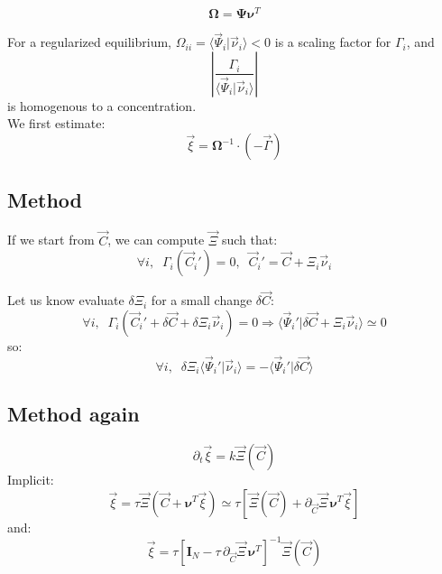 \documentclass[aps,12pt]{revtex4}
\begin{document}
\begin{equation}
	\bm{\Omega} = \bm{\Psi} \bm{\nu}^T
\end{equation}	

For a regularized equilibrium, $\Omega_{ii}=\langle \vec{\Psi}_i \vert \vec{\nu}_i \rangle < 0$ is
a scaling factor for $\Gamma_i$, and
\begin{equation}
	\left\vert \dfrac{\Gamma_i}{\langle \vec{\Psi}_i \vert \vec{\nu}_i \rangle} \right\vert
\end{equation}
is homogenous to a concentration.\\
We first estimate:
\begin{equation}
	\vec{\xi} =  {\bm{\Omega}}^{-1} \cdot (-\vec{\Gamma} )
\end{equation}

\subsection{Method}

If we start from $\vec{C}$, we can compute $\vec{\Xi}$ such that:
\begin{equation}
	\forall i, \;\; \Gamma_i(\vec{C}_i') = 0, \;\; \vec{C}_i' = \vec{C} + \Xi_i \vec{\nu}_i
\end{equation}

Let us know evaluate $\delta\Xi_i$ for a small change $\delta\vec{C}$:
\begin{equation}
	\forall i, \;\;  \Gamma_i(\vec{C}_i' + \delta\vec{C} + \delta\Xi_i \vec{\nu}_i) = 0 \Rightarrow 
	\langle \vec{\Psi}_i' \vert \delta\vec{C} +   \Xi_i \vec{\nu}_i \rangle \simeq 0 
\end{equation}
so:
\begin{equation}
	\forall i, \;\; \delta\Xi_i \langle \vec{\Psi}_i' \vert \vec{\nu}_i \rangle
	 = -  \langle\vec{\Psi}_i' \vert \delta\vec{C} \rangle
\end{equation}
  	

\subsection{Method again}

\begin{equation}
	\partial_t \vec{\xi} = k\vec{\Xi}(\vec{C})
\end{equation}
Implicit:
\begin{equation}
	\vec{\xi} = \tau \vec{\Xi}(\vec{C}+\bm{\nu}^T \vec{\xi} ) 
	\simeq \tau \left[ \vec{\Xi}(\vec{C}) + \partial_{\vec{C}}\vec{\Xi} \, \bm{\nu}^T \vec{\xi} \right]
\end{equation}
and:
\begin{equation}
	\vec{\xi} = \tau \left[ \bm{I}_N - \tau \, \partial_{\vec{C}}\vec{\Xi} \, \bm{\nu}^T \right]^{-1} \vec{\Xi}(\vec{C}) 
\end{equation}
\end{document}
